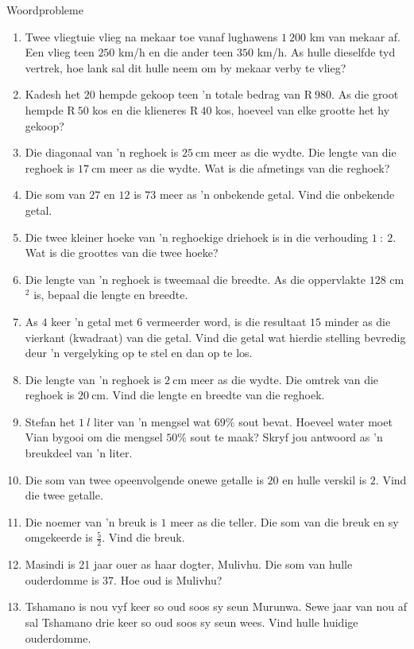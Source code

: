\begin{exercises}{Woordprobleme}
{
\begin{enumerate}[noitemsep, label=\textbf{\arabic*}. ] 
\item Twee vliegtuie vlieg na mekaar toe vanaf lughawens $1~200$ km van mekaar af. Een vlieg teen $250$ km/h en die ander teen $350$ km/h. As hulle dieselfde tyd vertrek, hoe lank sal dit hulle neem om by mekaar verby te vlieg?
\item Kadesh het $20$ hempde gekoop teen 'n totale bedrag van R$~980$. As die groot hempde R$~50$ kos en die klieneres R$~40$ kos, hoeveel van elke grootte het hy gekoop?
\item Die diagonaal van ’n reghoek is $25~$cm meer as die wydte. Die lengte van die reghoek is $17~$cm meer as die wydte. Wat is die afmetings van die reghoek?  
\item Die som van $27$ en $12$ is $73$ meer as ’n onbekende getal. Vind die onbekende getal.
\item Die twee kleiner hoeke van ’n reghoekige driehoek is in die verhouding $1~:~2$. Wat is die groottes van die
twee hoeke?
\item Die lengte van 'n reghoek is tweemaal die breedte. As die oppervlakte $128$ cm$^{2}$ is, bepaal die lengte en breedte.       
\item As $4$ keer ’n getal met $6$ vermeerder word, is die resultaat $15$ minder as die vierkant (kwadraat) van die
getal. Vind die getal wat hierdie stelling bevredig deur ’n vergelyking op te stel en dan op te los.
\item Die lengte van ’n reghoek is $2~$cm meer as die wydte. Die omtrek van die reghoek is  $20~$cm. Vind die lengte en breedte van die reghoek.
\item Stefan het $1~l$ liter van ’n mengsel wat $69\%$ sout bevat. Hoeveel water moet Vian bygooi om die mengsel $50\%$ sout te maak? Skryf jou antwoord as ’n breukdeel van ’n liter.
\item Die som van twee opeenvolgende onewe getalle is $20$ en hulle verskil is $2$. Vind die twee getalle.
\item Die noemer van 'n breuk is $1$ meer as die teller. Die som van die breuk en sy omgekeerde is $\frac{5}{2}$. Vind die breuk.
\item Masindi is 21 jaar ouer as haar dogter, Mulivhu. Die som van hulle ouderdomme is 37. Hoe oud is Mulivhu?
\item Tshamano is nou vyf keer so oud soos sy seun Murunwa. Sewe jaar van nou af sal Tshamano drie keer so oud soos sy seun wees. Vind hulle huidige ouderdomme.
\end{enumerate}


}
\end{exercises}
